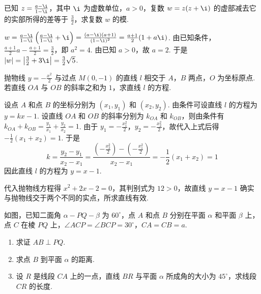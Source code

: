 \documentclass[UTF8,a4paper,oneside,11pt]{ctexbook}
\begin{document}
\begin{problem}
已知 \(z = \frac{a - \i}{1 - \i}\)，其中 \(\i\) 为虚数单位，\(a > 0\)，复数 \(w = z(z + \i)\) 的虚部减去它的实部所得的差等于 \(\frac{3}{2}\)，求复数 \(w\) 的模.
\end{problem}

\begin{solution}
\(w = \frac{a - \i}{1 - \i}\left(\frac{a - \i}{1 - \i} + \i\right) = \frac{(a - \i)(a + 1)}{(1 - \i)^2} = \frac{a + 1}{2}(1 + a\i)\). 由已知条件，\(\frac{a + 1}{2}a - \frac{a + 1}{2} = \frac{3}{2}\)，即 \(a^2 = 4\). 由已知 \(a > 0\)，故 \(a = 2\). 于是 \(|w| = \left|\frac{3}{2} + 3\i\right| = \frac{3}{2}\sqrt{5}\).
\end{solution}

\begin{problem}
抛物线 \(y = -\frac{x^2}{2}\) 与过点 \(M(0,-1)\) 的直线 \(l\) 相交于 \(A\)，\(B\) 两点，\(O\) 为坐标原点. 若直线 \(OA\) 与 \(OB\) 的斜率之和为 \(1\)，求直线 \(l\) 的方程.
\end{problem}

\begin{solution}
设点 \(A\) 和点 \(B\) 的坐标分别为 \((x_1,y_1)\) 和 \((x_2,y_2)\). 由条件可设直线 \(l\) 的方程为 \(y = kx - 1\). 设直线 \(OA\) 和 \(OB\) 的斜率分别为 \(k_{OA}\) 和 \(k_{OB}\)，则由条件有
\(k_{OA} + k_{OB} = \frac{y_1}{x_1} + \frac{y_2}{x_2} = 1\).
由于 \(y_1 = -\frac{x_1^2}{2}\)，\(y_2 = -\frac{x_2^2}{2}\)，故代入上式后得 \(-\frac{1}{2}(x_1 + x_2) = 1\). 于是
\[
 k = \frac{y_2 - y_1}{x_2 - x_1} = \frac{\left(-\frac{x_2^2}{2}\right) - \left(-\frac{x_1^2}{2}\right)}{x_2 - x_1} = -\frac{1}{2}(x_1 + x_2) = 1
\]
因此直线 \(l\) 的方程为 \(y = x - 1\).

代入抛物线方程得 \(x^2+2x-2=0\)，其判别式为 \(12>0\)，故直线 \(y=x-1\) 确实与抛物线交于两个不同的实点，所求直线有效.

\end{solution}

\begin{problem}
如图，已知二面角 \(\alpha - PQ - \beta\) 为 \(60^{\circ}\)，点 \(A\) 和点 \(B\) 分别在平面 \(\alpha\) 和平面 \(\beta\) 上，点 \(C\) 在棱 \(PQ\) 上，\(\angle ACP = \angle BCP = 30^{\circ}\)，\(CA = CB = a\).

\begin{enumerate}
\item 求证 \(AB \perp PQ\).
\item 求点 \(B\) 到平面 \(\alpha\) 的距离.
\item 设 \(R\) 是线段 \(CA\) 上的一点，直线 \(BR\) 与平面 \(\alpha\) 所成角的大小为 \(45^{\circ}\)，求线段 \(CR\) 的长度.
\end{enumerate}

\end{problem}
\end{document}
